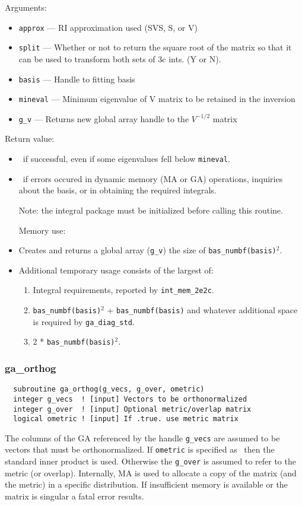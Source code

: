  Arguments:
\begin{itemize}
\item \verb+approx+ --- RI approximation used (SVS, S, or V)
\item \verb+split+ ---  Whether or not to return the square root of the matrix
              so that it can be used to transform both sets of 3c ints.
              (Y or N).
\item \verb+basis+ --- Handle to fitting basis
\item \verb+mineval+ --- Minimum eigenvalue of V matrix to be retained in 
              the inversion
\item \verb+g_v+ ---  Returns new global array handle to the $V^{-1/2}$ matrix
\end{itemize}

Return value:
\begin{itemize}
\item \TRUE\ if successful, even if some eigenvalues fell below \verb+mineval+.
\item \FALSE\ if errors occured in dynamic memory (MA or GA) operations,
inquiries about the basis, or in obtaining the required integrals.

Note: the integral package must be initialized before calling this routine.

Memory use:
\item Creates and returns a global array (\verb+g_v+) the size of 
\verb+bas_numbf(basis)+$^2$.
\item Additional temporary usage consists of the largest of:
\begin{enumerate}
\item Integral requirements, reported by \verb+int_mem_2e2c+.
\item \verb+bas_numbf(basis)+$^2$ + \verb+bas_numbf(basis)+ and whatever additional
        space is required by \verb+ga_diag_std+.
\item 2 * \verb+bas_numbf(basis)+$^2$.
\end{enumerate}
\end{itemize}

\subsubsection{{ga\_orthog}}
\begin{verbatim}
  subroutine ga_orthog(g_vecs, g_over, ometric)
  integer g_vecs  ! [input] Vectors to be orthonormalized
  integer g_over  ! [input] Optional metric/overlap matrix
  logical ometric ! [input] If .true. use metric matrix
\end{verbatim}
The columns of the GA referenced by the handle \verb+g_vecs+ are
assumed to be vectors that must be orthonormalized.  If \verb+ometric+
is specified as \FALSE\ then the standard inner product is used.
Otherwise the \verb+g_over+ is assumed to refer to the metric (or
overlap).  Internally, MA is used to allocate a copy of the matrix
(and the metric) in a specific distribution.  If insufficient memory
is available or the matrix is singular a fatal error results.

